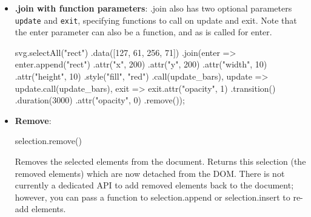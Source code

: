 \documentclass{report}
\begin{document}
\begin{itemize}
\begin{jscode}
                update.exit().remove();
            \end{jscode}
            \bigbreak \noindent 
            For 
            \bigbreak \noindent 
            \begin{jscode}
                svg.selectAll("rect")
                    .data(data)
                    .join("circle");
            \end{jscode}
            \bigbreak \noindent 
            \begin{itemize}
                \item \textbf{Update selection}: Existing <rect> elements are matched to data
                    \bigbreak \noindent 
                    They remain <rect> elements (they are not converted)
                \item \textbf{Enter selection}: For new data items, D3 creates <circle> elements
                \item \textbf{Exit selection}: Extra <rect> elements (without data) are removed
            \end{itemize}
        \item \textbf{.join with function parameters}: .join also has two optional parameters \texttt{update} and \texttt{exit}, specifying functions to call on update and exit. Note that the enter parameter can also be a function, and as is called for enter.
            \bigbreak \noindent 
            \begin{jscode}
            svg.selectAll("rect")
            .data([127, 61, 256, 71])
            .join(enter => enter.append("rect")
                   .attr("x", 200)
                   .attr("y", 200)
                   .attr("width", 10)
                   .attr("height", 10)
                   .style("fill", "red")
                   .call(update_bars),
                 update => update.call(update_bars),
                 exit => exit.attr("opacity", 1)
                   .transition()
                   .duration(3000)
                   .attr("opacity", 0)
                   .remove());
            \end{jscode}
        \item \textbf{Remove}: 
            \bigbreak \noindent 
            \begin{jscode}
            selection.remove()
            \end{jscode}
            \bigbreak \noindent 
            Removes the selected elements from the document. Returns this selection (the removed elements) which are now detached from the DOM. There is not currently a dedicated API to add removed elements back to the document; however, you can pass a function to selection.append or selection.insert to re-add elements.

\end{itemize}
\end{document}
